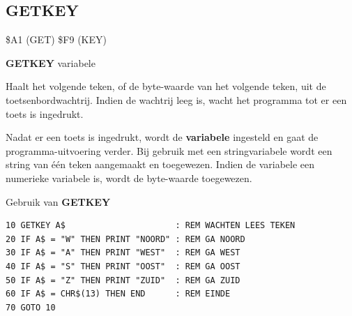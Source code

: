 \subsection{GETKEY}
\begin{description}[leftmargin=2cm,style=nextline]
\item [Token:]    \$A1 (GET) \$F9 (KEY)

\item [Formaat:]   {\bf GETKEY} variabele

\item [Gebruik:]    Haalt het volgende teken, of de byte-waarde van het volgende teken, uit de toetsenbordwachtrij. Indien de wachtrij leeg is, wacht het programma tot er een toets is ingedrukt.

                  Nadat er een toets is ingedrukt, wordt de {\bf variabele} ingesteld en gaat de programma-uitvoering verder. Bij gebruik met een stringvariabele wordt een string van één teken aangemaakt en toegewezen. Indien de variabele een numerieke variabele is, wordt de byte-waarde toegewezen.

\item [Voorbeeld:]  Gebruik van {\bf GETKEY}

\begin{tcolorbox}[colback=black,coltext=white]
\verbatimfont{\codefont}
\begin{verbatim}
10 GETKEY A$                      : REM WACHTEN LEES TEKEN
20 IF A$ = "W" THEN PRINT "NOORD" : REM GA NOORD
30 IF A$ = "A" THEN PRINT "WEST"  : REM GA WEST
40 IF A$ = "S" THEN PRINT "OOST"  : REM GA OOST
50 IF A$ = "Z" THEN PRINT "ZUID"  : REM GA ZUID
60 IF A$ = CHR$(13) THEN END      : REM EINDE
70 GOTO 10
\end{verbatim}
\end{tcolorbox}
\end{description}


\newpage
